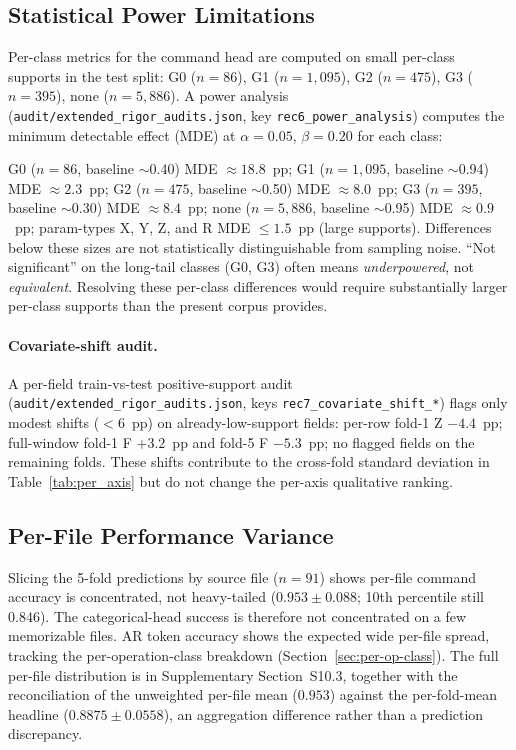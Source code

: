 \documentclass[sensors,article,submit,moreauthors,pdftex]{Definitions/mdpi}
\begin{document}
\subsection{Statistical Power Limitations}
\label{sec:lim-power}

Per-class metrics for the command head are computed on small per-class supports in the test split: G0 ($n\!=\!86$), G1 ($n\!=\!1{,}095$), G2 ($n\!=\!475$), G3 ($n\!=\!395$), none ($n\!=\!5{,}886$). A power analysis (\texttt{audit/extended\_rigor\_audits.json}, key \texttt{rec6\_power\_analysis}) computes the minimum detectable effect (MDE) at $\alpha\!=\!0.05$, $\beta\!=\!0.20$ for each class:

G0 ($n\!=\!86$, baseline $\sim$0.40) MDE $\approx 18.8$~pp; G1 ($n\!=\!1{,}095$, baseline $\sim$0.94) MDE $\approx 2.3$~pp; G2 ($n\!=\!475$, baseline $\sim$0.50) MDE $\approx 8.0$~pp; G3 ($n\!=\!395$, baseline $\sim$0.30) MDE $\approx 8.4$~pp; none ($n\!=\!5{,}886$, baseline $\sim$0.95) MDE $\approx 0.9$~pp; param-types X, Y, Z, and R MDE $\le 1.5$~pp (large supports). Differences below these sizes are not statistically distinguishable from sampling noise. ``Not significant'' on the long-tail classes (G0, G3) often means \emph{underpowered}, not \emph{equivalent}. Resolving these per-class differences would require substantially larger per-class supports than the present corpus provides.

\paragraph{Covariate-shift audit.}\label{sec:lim-covariate} A per-field train-vs-test positive-support audit (\texttt{audit/extended\_rigor\_audits.json}, keys \texttt{rec7\_covariate\_shift\_*}) flags only modest shifts ($<\!6$~pp) on already-low-support fields: per-row fold-1 Z $-4.4$~pp; full-window fold-1 F $+3.2$~pp and fold-5 F $-5.3$~pp; no flagged fields on the remaining folds. These shifts contribute to the cross-fold standard deviation in Table~\ref{tab:per_axis} but do not change the per-axis qualitative ranking.

\subsection{Per-File Performance Variance}
\label{sec:lim-per-file}

Slicing the 5-fold predictions by source file ($n=91$) shows per-file command accuracy is concentrated, not heavy-tailed ($0.953 \pm 0.088$; 10th percentile still $0.846$). The categorical-head success is therefore not concentrated on a few memorizable files. AR token accuracy shows the expected wide per-file spread, tracking the per-operation-class breakdown (Section~\ref{sec:per-op-class}). The full per-file distribution is in Supplementary Section~S10.3, together with the reconciliation of the unweighted per-file mean ($0.953$) against the per-fold-mean headline ($0.8875 \pm 0.0558$), an aggregation difference rather than a prediction discrepancy.
\end{document}
